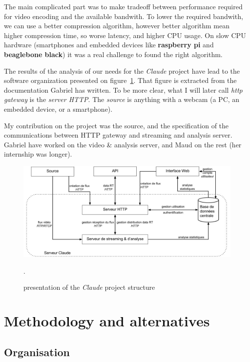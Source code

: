 \documentclass[a4paper,11pt]{custom}
\newcommand{\rpi}{\textbf{raspberry pi}\xspace}
\newcommand{\bbb}{\textbf{beaglebone black}\xspace}
\newcommand{\claude}{\textit{Claude}\xspace}
\begin{document}
The main complicated part was to make tradeoff between performance required for
video encoding and the available bandwith. To lower the required bandwith, we
can use a better compression algorithm, however better algorithm mean higher
compression time, so worse latency, and higher CPU usage. On slow CPU hardware
(smartphones and embedded devices like \rpi{} and \bbb{}) it was a real
challenge to found the right algorithm.

The results of the analysis of our needs for the \claude{} project have lead to
the software organization presented on figure~\ref{fig:architecture}. That figure
is extracted from the documentation Gabriel has written. To be more clear, what I
will later call \textit{http gateway} is the \textit{server HTTP}. The \textit{source} is anything
with a webcam (a PC, an embedded device, or a smartphone).

My contribution on the project was the source, and the specification of the
communications between HTTP gateway and streaming and analysis server. Gabriel
have worked on the video \& analysis server, and Maud on the rest (her internship
was longer).

\begin{figure}
  \centering
  \includegraphics[width=\textwidth]{architecture.jpg}
  \label{fig:architecture}
  \caption{presentation of the \claude{} project structure}.
\end{figure}

\chapter{Methodology and alternatives}
\label{sec:methodology}

\section{Organisation}
\end{document}

